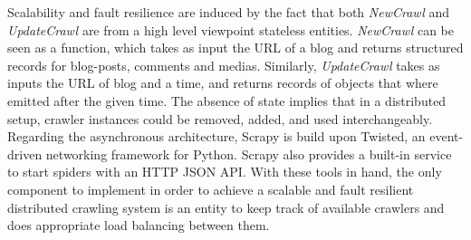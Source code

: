 Scalability and fault resilience are induced by the fact that both \emph{NewCrawl} and \emph{UpdateCrawl} are from a high level viewpoint stateless entities. \emph{NewCrawl} can be seen as a function, which takes as input the URL of a blog and returns structured records for blog-posts, comments and medias. Similarly, \emph{UpdateCrawl} takes as inputs the URL of blog and a time, and returns records of objects that where emitted after the given time. The absence of state implies that in a distributed setup, crawler instances could be removed, added, and used interchangeably. Regarding the asynchronous architecture, Scrapy is build upon Twisted\cite{twisted2013}, an event-driven networking framework for Python. Scrapy also provides a built-in service to start spiders with an HTTP JSON API. With these tools in hand, the only component to implement in order to achieve a scalable and fault resilient distributed crawling system is an entity to keep track of available crawlers and does appropriate load balancing between them.
